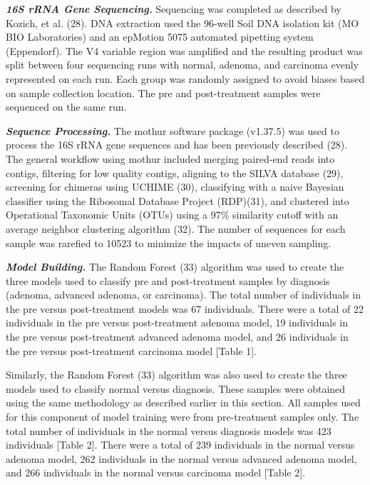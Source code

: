 \documentclass[12pt,]{article}
\begin{document}
\textbf{\emph{16S rRNA Gene Sequencing.}} Sequencing was completed as
described by Kozich, et al. (28). DNA extraction used the 96-well Soil
DNA isolation kit (MO BIO Laboratories) and an epMotion 5075 automated
pipetting system (Eppendorf). The V4 variable region was amplified and
the resulting product was split between four sequencing runs with
normal, adenoma, and carcinoma evenly represented on each run. Each
group was randomly assigned to avoid biases based on sample collection
location. The pre and post-treatment samples were sequenced on the same
run.

\textbf{\emph{Sequence Processing.}} The mothur software package
(v1.37.5) was used to process the 16S rRNA gene sequences and has been
previously described (28). The general workflow using mothur included
merging paired-end reads into contigs, filtering for low quality
contigs, aligning to the SILVA database (29), screening for chimeras
using UCHIME (30), classifying with a naive Bayesian classifier using
the Ribosomal Database Project (RDP)(31), and clustered into Operational
Taxonomic Units (OTUs) using a 97\% similarity cutoff with an average
neighbor clustering algorithm (32). The number of sequences for each
sample was rarefied to 10523 to minimize the impacts of uneven sampling.

\textbf{\emph{Model Building.}} The Random Forest (33) algorithm was
used to create the three models used to classify pre and post-treatment
samples by diagnosis (adenoma, advanced adenoma, or carcinoma). The
total number of individuals in the pre versus post-treatment models was
67 individuals. There were a total of 22 individuals in the pre versus
post-treatment adenoma model, 19 individuals in the pre versus
post-treatment advanced adenoma model, and 26 individuals in the pre
versus post-treatment carcinoma model {[}Table 1{]}.

Similarly, the Random Forest (33) algorithm was also used to create the
three models used to classify normal versus diagnosis. These samples
were obtained using the same methodology as described earlier in this
section. All samples used for this component of model training were from
pre-treatment samples only. The total number of individuals in the
normal versus diagnosis models was 423 individuals {[}Table 2{]}. There
were a total of 239 individuals in the normal versus adenoma model, 262
individuals in the normal versus advanced adenoma model, and 266
individuals in the normal versus carcinoma model {[}Table 2{]}.
\end{document}
